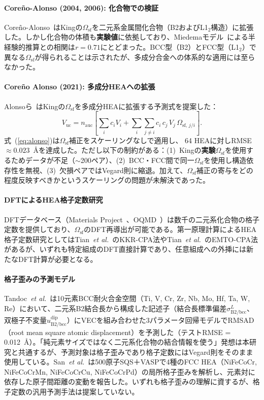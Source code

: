 \documentclass[5p,10pt]{elsarticle}
\begin{document}
\paragraph{Coreño-Alonso (2004, 2006): 化合物での検証}
Coreño-Alonso~\cite{CorenoAlonso2004,CorenoAlonso2006}はKingの$\Omega_\text{sf}$を二元系金属間化合物（B2およびL1$_2$構造）に拡張した。しかし化合物の体積も\textbf{実験値}に依拠しており、Miedemaモデル~\cite{deBoer1988}による半経験的推算との相関は$r = 0.71$にとどまった。BCC型（B2）とFCC型（L1$_2$）で異なる$\Omega_\text{sf}$が得られることは示されたが、多成分合金への体系的な適用には至らなかった。

\paragraph{Coreño Alonso (2021): 多成分HEAへの拡張}
Alonsoら~\cite{Alonso2021}はKingの$\Omega_\text{sf}$を多成分HEAに拡張する予測式を提案した：
\begin{equation}
  V_\text{uc}
  = n_\text{auc} \!\left[
    \sum_{i} c_i V_i
    + \sum_{i} \sum_{j \ne i} c_i\, c_j\, V_j\,
      \Omega_{\text{sf},\, j/i}
  \right]\!.
  \label{eq:alonso}
\end{equation}
式~(\ref{eq:alonso})は$\Omega_\text{sf}$補正をスケーリングなしで適用し、 64 HEAに対しRMSE $\approx 0.023$~\AA{}を達成した。ただし以下の制約がある：(1)~Kingの\textbf{実験}$\Omega_\text{sf}$を使用するためデータが不足（$\sim$200ペア）、(2)~BCC・FCC間で同一$\Omega_\text{sf}$を使用し構造依存性を無視、(3)~欠損ペアではVegard則に縮退。加えて、$\Omega_\text{sf}$補正の寄与をどの程度反映すべきかというスケーリングの問題が未解決であった。

\paragraph{DFTによるHEA格子定数研究}
DFTデータベース（Materials Project~\cite{Jain2013}、OQMD~\cite{Saal2013}）は数千の二元系化合物の格子定数を提供しており、$\Omega_\text{sf}$のDFT再導出が可能である。第一原理計算によるHEA格子定数研究としてはTian~\emph{et al.}~\cite{Tian2013}のKKR-CPA法やTian~\emph{et al.}~\cite{Tian2015}のEMTO-CPA法があるが、いずれも特定組成のDFT直接計算であり、任意組成への外挿には新たなDFT計算が必要となる。

\paragraph{格子歪みの予測モデル}
Tandoc~\emph{et al.}~\cite{Tandoc2023}は10元素BCC耐火合金空間（Ti, V, Cr, Zr, Nb, Mo, Hf, Ta, W, Re）において、二元系B2結合長から構成した記述子（結合長標準偏差$\sigma^L_{\text{B2/bcc}}$、双極子不変量$u^{\text{dip}}_{\text{B2/bcc}}$）にVECを組み合わせた3パラメータ回帰モデルでRMSAD（root mean square atomic displacement）を予測した（テストRMSE = 0.012~\AA{}）。「純元素サイズではなく二元系化合物の結合情報を使う」発想は本研究と共通するが、予測対象は格子歪みであり格子定数にはVegard則をそのまま使用している。San~\emph{et al.}~\cite{San2021}は500原子SQS＋VASPで4種のFCC HEA（NiFeCoCr, NiFeCoCrMn, NiFeCoCrCu, NiFeCoCrPd）の局所格子歪みを解析し、元素対に依存した原子間距離の変動を報告した。いずれも格子歪みの理解に資するが、格子定数の汎用予測手法は提案していない。
\end{document}

